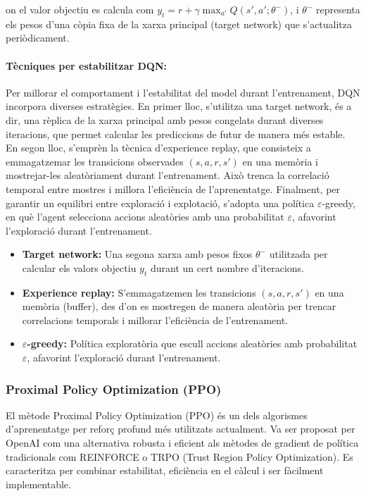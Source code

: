 \documentclass[12pt,a4paper,twoside]{book}
\begin{document}
on el valor objectiu es calcula com $y_t = r + \gamma \max_{a'} Q(s', a'; \theta^-)$, i $\theta^-$ representa els pesos d’una còpia fixa de la xarxa principal (target network) que s’actualitza periòdicament.


\paragraph{Tècniques per estabilitzar DQN:}
Per millorar el comportament i l’estabilitat del model durant l’entrenament, DQN incorpora diverses estratègies. En primer lloc, s’utilitza una target network, és a dir, una rèplica de la xarxa principal amb pesos congelats durant diverses iteracions, que permet calcular les prediccions de futur de manera més estable. En segon lloc, s’emprèn la tècnica d’experience replay, que consisteix a emmagatzemar les transicions observades $(s,a,r,s')$ en una memòria i mostrejar-les aleatòriament durant l’entrenament. Això trenca la correlació temporal entre mostres i millora l’eficiència de l’aprenentatge. Finalment, per garantir un equilibri entre exploració i explotació, s’adopta una política $\varepsilon$-greedy, en què l’agent selecciona accions aleatòries amb una probabilitat $\varepsilon$, afavorint l'exploració durant l'entrenament.

\begin{itemize}
  \item \textbf{Target network:} Una segona xarxa amb pesos fixos $\theta^-$ utilitzada per calcular els valors objectiu $y_t$ durant un cert nombre d'iteracions.
  \item \textbf{Experience replay:} S'emmagatzemen les transicions $(s,a,r,s')$ en una memòria (buffer), des d'on es mostregen de manera aleatòria per trencar correlacions temporals i millorar l'eficiència de l'entrenament.
  \item \textbf{$\varepsilon$-greedy:} Política exploratòria que escull accions aleatòries amb probabilitat $\varepsilon$, afavorint l'exploració durant l'entrenament.
\end{itemize}


\subsubsection{Proximal Policy Optimization (PPO)}

El mètode Proximal Policy Optimization (PPO) és un dels algorismes d'aprenentatge per reforç profund més utilitzats actualment. Va ser proposat per OpenAI com una alternativa robusta i eficient als mètodes de gradient de política tradicionals com REINFORCE o TRPO (Trust Region Policy Optimization)\cite{}. Es caracteritza per combinar estabilitat,  eficiència en el càlcul i ser fàcilment implementable.
\end{document}
